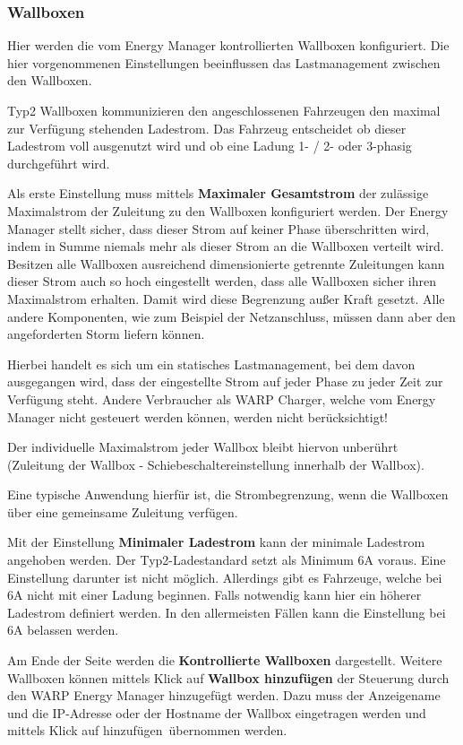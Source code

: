 \documentclass[a4paper,10pt]{article}
\newcommand{\hint}[1]{\begin{tcolorbox}[colback=boxgray,colframe=black,coltext=
white,title=Hinweis,left*=2mm,right*=2mm,boxsep=1mm,bottom=1mm,top=1mm]#1\end{tcolorbox}}
\begin{document}
\begin{multicols*}{2}
	\subsubsection{Wallboxen}
	Hier werden die vom Energy Manager kontrollierten Wallboxen konfiguriert.
	Die hier vorgenommenen Einstellungen beeinflussen das Lastmanagement
	zwischen den Wallboxen.

	Typ2 Wallboxen kommunizieren den angeschlossenen Fahrzeugen den maximal zur
	Verfügung stehenden Ladestrom. Das Fahrzeug entscheidet ob dieser Ladestrom
	voll ausgenutzt wird und ob eine Ladung 1- / 2- oder 3-phasig durchgeführt
	wird.

	Als erste Einstellung muss mittels \textbf{Maximaler Gesamtstrom} der 
	zulässige Maximalstrom der Zuleitung zu den Wallboxen konfiguriert werden. 
	Der Energy Manager stellt sicher, dass dieser
	Strom auf keiner Phase überschritten wird, indem in Summe niemals mehr als
	dieser Strom an die Wallboxen verteilt wird. Besitzen alle Wallboxen
	ausreichend dimensionierte getrennte Zuleitungen kann dieser Strom auch so
	hoch eingestellt werden, dass alle Wallboxen sicher ihren Maximalstrom
	erhalten. Damit wird diese Begrenzung außer Kraft gesetzt. Alle andere
	Komponenten, wie zum Beispiel der Netzanschluss, müssen dann aber den
	angeforderten Storm liefern können. 

	\hint{Hierbei handelt es sich um ein statisches Lastmanagement, bei dem
	davon ausgegangen wird, dass der eingestellte Strom auf jeder Phase
	zu jeder Zeit zur Verfügung steht. Andere Verbraucher als WARP Charger, 
	welche vom Energy Manager nicht gesteuert werden können, werden nicht
	berücksichtigt!}

	Der individuelle Maximalstrom jeder Wallbox bleibt hiervon unberührt
	(Zuleitung der Wallbox - Schiebeschaltereinstellung innerhalb der Wallbox).

	Eine typische Anwendung hierfür ist, die Strombegrenzung, 
	wenn die Wallboxen über eine gemeinsame Zuleitung verfügen.

	Mit der Einstellung \textbf{Minimaler Ladestrom} kann der minimale Ladestrom
	angehoben werden. Der Typ2-Ladestandard setzt als Minimum 6A voraus. Eine
	Einstellung darunter ist nicht möglich. Allerdings gibt es Fahrzeuge, welche 
	bei 6A nicht mit einer Ladung beginnen. Falls notwendig kann hier ein höherer 
	Ladestrom definiert werden. In den allermeisten Fällen kann die Einstellung
	bei 6A belassen werden.

	Am Ende der Seite werden die \textbf{Kontrollierte
	Wallboxen} dargestellt. Weitere Wallboxen können mittels Klick auf
	\textbf{Wallbox hinzufügen} der Steuerung durch den WARP Energy Manager
	hinzugefügt werden. Dazu muss der Anzeigename und die IP-Adresse oder der
	Hostname der Wallbox eingetragen werden und mittels Klick auf \glqq
	hinzufügen\grqq~übernommen werden.


\end{multicols*}
\end{document}
